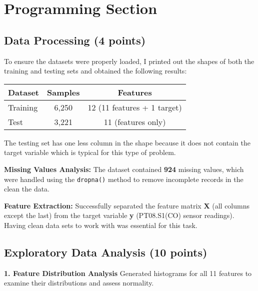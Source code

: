 \documentclass{article}
\begin{document}
\section*{\textbf{Programming Section}}

\subsection*{Data Processing (4 points)}

To ensure the datasets were properly loaded, I printed out the shapes of both the training and testing sets and obtained the following results:

\begin{center}
\begin{tabular}{|l|c|c|}
\hline
\textbf{Dataset} & \textbf{Samples} & \textbf{Features} \\
\hline
Training & 6,250 & 12 (11 features + 1 target) \\
Test     & 3,221 & 11 (features only) \\
\hline
\end{tabular}
\end{center}

The testing set has one less column in the shape because it does not contain the target variable which is typical for this type of problem.

\textbf{Missing Values Analysis:}  
The dataset contained \textbf{924} missing values, which were handled using the \texttt{dropna()} method to remove incomplete records in the clean the data. 

\textbf{Feature Extraction:}  
Successfully separated the feature matrix \textbf{X} (all columns except the last) from the target variable \textbf{y} (PT08.S1(CO) sensor readings). Having clean data sets to work with was essential for this task.



\subsection*{Exploratory Data Analysis (10 points)}


\textbf{1. Feature Distribution Analysis}
\newline
Generated histograms for all 11 features to examine their distributions and assess normality.
\end{document}
